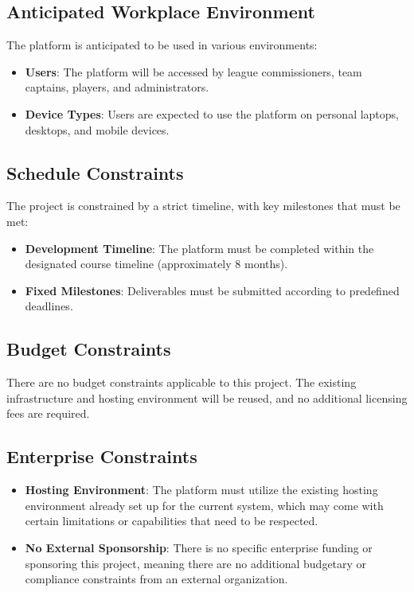 \documentclass[12pt, titlepage]{article}
\begin{document}
\subsection{Anticipated Workplace Environment}
The platform is anticipated to be used in various environments:
\begin{itemize}
    \item \textbf{Users}: The platform will be accessed by league commissioners, team captains, players, and administrators.
    \item \textbf{Device Types}: Users are expected to use the platform on personal laptops, desktops, and mobile devices.
\end{itemize}

\subsection{Schedule Constraints}
The project is constrained by a strict timeline, with key milestones that must be met:
\begin{itemize}
    \item \textbf{Development Timeline}: The platform must be completed within the designated course timeline (approximately 8 months).
    \item \textbf{Fixed Milestones}: Deliverables must be submitted according to predefined deadlines.
\end{itemize}

\subsection{Budget Constraints}
There are no budget constraints applicable to this project. The existing infrastructure and hosting environment will be reused, and no additional licensing fees are required.

\subsection{Enterprise Constraints}
\begin{itemize}
    \item \textbf{Hosting Environment}: The platform must utilize the existing hosting environment already set up for the current system, which may come with certain limitations or capabilities that need to be respected.
    \item \textbf{No External Sponsorship}: There is no specific enterprise funding or sponsoring this project, meaning there are no additional budgetary or compliance constraints from an external organization.
\end{itemize}
\end{document}
